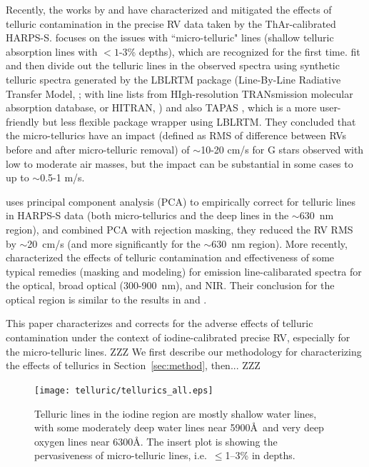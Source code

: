 Recently, the works by \cite{artigau2014} and \cite{cunha2014} have
characterized and mitigated the effects of telluric contamination in
the precise RV data taken by the ThAr-calibrated HARPS-S.
\cite{cunha2014} focuses on the issues with ``micro-telluric" lines
(shallow telluric absorption lines with $<1$-3\% depths), which are
recognized for the first time. \cite{cunha2014} fit and then divide
out the telluric lines in the observed spectra using synthetic
telluric spectra generated by the LBLRTM package (Line-By-Line
Radiative Transfer Model, \citealt{lblrtm}; with line lists from
HIgh-resolution TRANsmission molecular absorption database, or HITRAN,
\citealt{hitran2013}) and also TAPAS \citep{tapas}, which is a more
user-friendly but less flexible package wrapper using LBLRTM. They
concluded that the micro-tellurics have an impact (defined as RMS of
difference between RVs before and after micro-telluric removal) of
$\sim$10-20 cm/s for G stars observed with low to moderate air masses,
but the impact can be substantial in some cases to up to $\sim$0.5-1
m/s.

\cite{artigau2014} uses principal component analysis (PCA) to
empirically correct for telluric lines in HARPS-S data (both
micro-tellurics and the deep lines in the $\sim$630~nm region), and
combined PCA with rejection masking, they reduced the RV RMS by
$\sim$20~cm/s (and more significantly for the $\sim$630~nm
region). More recently, \cite{2016AAS...22713719S} characterized the
effects of telluric contamination and effectiveness of some typical
remedies (masking and modeling) for emission line-calibarated spectra
for the optical, broad optical (300-900~nm), and NIR. Their conclusion
for the optical region is similar to the results in \cite{artigau2014}
and \cite{cunha2014}.

This paper characterizes and corrects for the adverse effects of
telluric contamination under the context of iodine-calibrated precise
RV, especially for the micro-telluric lines. ZZZ We first describe our
methodology for characterizing the effects of tellurics in
Section~\ref{sec:method}, then... ZZZ


\begin{figure}
\texttt{[image: telluric/tellurics\_all.eps]} 
\caption{Telluric lines in the iodine region are mostly shallow water
lines, with some moderately deep water lines near 5900\AA\ and very
deep oxygen lines near 6300\AA. The insert plot is showing the
pervasiveness of micro-telluric lines, i.e.~$\leq$1--3\% in depths.
\label{telluric:fig:telluric}}
\end{figure}



